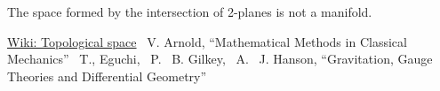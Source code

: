 \documentclass[a4paper,10pt]{article}
\begin{document}
The space formed by the intersection of 2-planes is not a manifold.

\begin{thebibliography}{1}
 \href{https://en.wikipedia.org/wiki/Topological_space}{Wiki: Topological space}
 ~V. Arnold, ``Mathematical Methods in Classical Mechanics''
 ~T., Eguchi, ~P. ~B. Gilkey, ~A. ~J. Hanson,  ``Gravitation, Gauge Theories and Differential Geometry''
\end{thebibliography}
\end{document}
